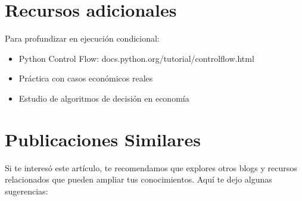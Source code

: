 \documentclass[
  doc,
  floatsintext,
  longtable,
  a4paper,
  nolmodern,
  notxfonts,
  notimes,
  12pt,
  colorlinks=true,linkcolor=blue,citecolor=blue,urlcolor=blue]{apa7}
\providecommand{\tightlist}{%
  \setlength{\itemsep}{0pt}\setlength{\parskip}{0pt}}
\begin{document}
\section{Recursos adicionales}\label{recursos-adicionales}

Para profundizar en ejecución condicional:

\begin{itemize}
\tightlist
\item
  Python Control Flow: docs.python.org/tutorial/controlflow.html
\item
  Práctica con casos económicos reales
\item
  Estudio de algoritmos de decisión en economía
\end{itemize}

\section{Publicaciones Similares}\label{publicaciones-similares}

Si te interesó este artículo, te recomendamos que explores otros blogs y
recursos relacionados que pueden ampliar tus conocimientos. Aquí te dejo
algunas sugerencias:
\end{document}
